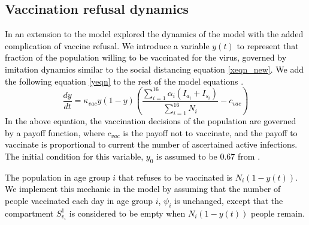 \subsection{Vaccination refusal dynamics}
\label{refusal}
\textcolor{black}{In an extension to the model explored the dynamics of the model with the added complication of vaccine refusal. We introduce a variable $y(t)$ to represent that fraction of the population willing to be vaccinated for the virus, governed by imitation dynamics similar to the social distancing equation \ref{xeqn_new}. We add the following equation \ref{yeqn} to the rest of the model equations \cite{bauch2005imitation, bauch2012evolutionary}.
\begin{equation}
    \frac{d y}{dt} = \kappa_{vac} y(1 - y)\left(\frac{\sum_{i=1}^{16}\alpha_i(I_{a_i} + I_{s_i})}{\sum_{i=1}^{16} N_i} - c_{vac}\right)
    \label{yeqn}
\end{equation}
In the above equation, the vaccination decisions of the population are governed by a payoff function, where $c_{vac}$ is the payoff not to vaccinate, and the payoff to vaccinate is proportional to current the number of ascertained active infections. The initial condition for this variable, $y_0$ is assumed to be $0.67$ from \cite{MALIK2020100495}.}

\textcolor{black}{The population in age group $i$ that refuses to be vaccinated is $N_i (1 - y(t))$. We implement this mechanic in the model by assuming that the number of people vaccinated each day in age group $i$, $\psi_i$ is unchanged, except that the compartment $S_{v_i}^1$ is considered to be empty when $N_i (1 - y(t))$ people remain.}


